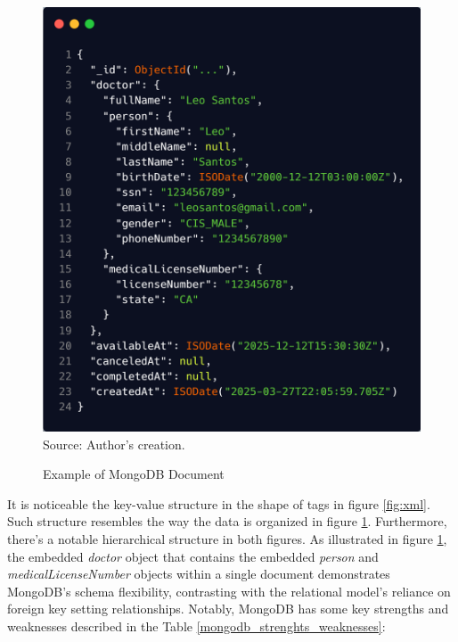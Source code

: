 \begin{figure}[H]
    \centering
    \caption{Example of MongoDB Document}
    \includegraphics[width=1\linewidth]{figures/db/mongodb.png}
    \label{fig:mongodb}
    \footnotesize Source: Author's creation.
\end{figure}

It is noticeable the key-value structure in the shape of tags in figure \ref{fig:xml}. Such structure resembles the way the data  is organized in figure \ref{fig:mongodb}. Furthermore, there's a notable hierarchical structure in both figures.  As illustrated in figure \ref{fig:mongodb}, the embedded \textit{doctor} object that contains the embedded \textit{person} 
 and \textit{medicalLicenseNumber} objects within a single document demonstrates MongoDB's schema flexibility,  contrasting with the relational model's reliance on foreign key setting relationships. Notably, MongoDB has some key strengths and weaknesses described in the Table \ref{mongodb_strenghts_weaknesses}:


